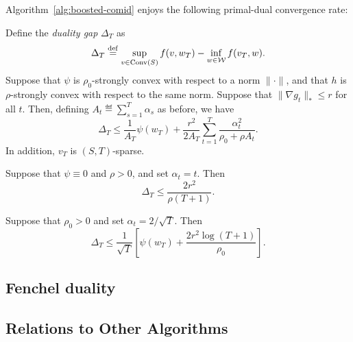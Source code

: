 \documentclass[paper.tex]{subfiles}
\begin{document}
Algorithm~\ref{alg:boosted-comid} enjoys the following primal-dual convergence rate:
\begin{theorem}
Define the \emph{duality gap} $\Delta_T$ as
\[ \Delta_T \stackrel{\mathrm{def}}{=} \sup_{v \in \operatorname{Conv}(S)} f(v, w_T) - \inf_{w \in \mathcal{W}} f(v_T, w). \]
Suppose that $\psi$ is $\rho_0$-strongly convex with 
respect to a norm $\|\cdot\|$, and that $h$ is $\rho$-strongly 
convex with respect to the same norm. Suppose that 
$\|\nabla g_t\|_* \leq r$ for all $t$. Then, defining 
$A_t \eqdef \sum_{s=1}^T \alpha_s$ as before, we have
\[ \Delta_T \leq \frac{1}{A_T} \psi(w_T) + \frac{r^2}{2A_T} \sum_{t=1}^T \frac{\alpha_t^2}{\rho_0 + \rho A_t}. \]
In addition, $v_T$ is $(S, T)$-sparse.
\end{theorem}
\begin{corollary}
Suppose that $\psi \equiv 0$ and $\rho > 0$, and set $\alpha_t = t$. Then 
\[ \Delta_T \leq \frac{2r^2}{\rho (T+1)}. \]
\end{corollary}

\begin{corollary}
Suppose that $\rho_0 > 0$ and set $\alpha_t = 2/\sqrt{T}$. Then
\[ \Delta_T \leq \frac{1}{\sqrt{T}} \left[ \psi(w_T) + \frac{2r^2\log(T+1)}{\rho_0} \right]. \]
\end{corollary}

\subsection{Fenchel duality}
\label{sec:fenchel}

\subsection{Relations to Other Algorithms}
\label{sec:derived}
\end{document}
